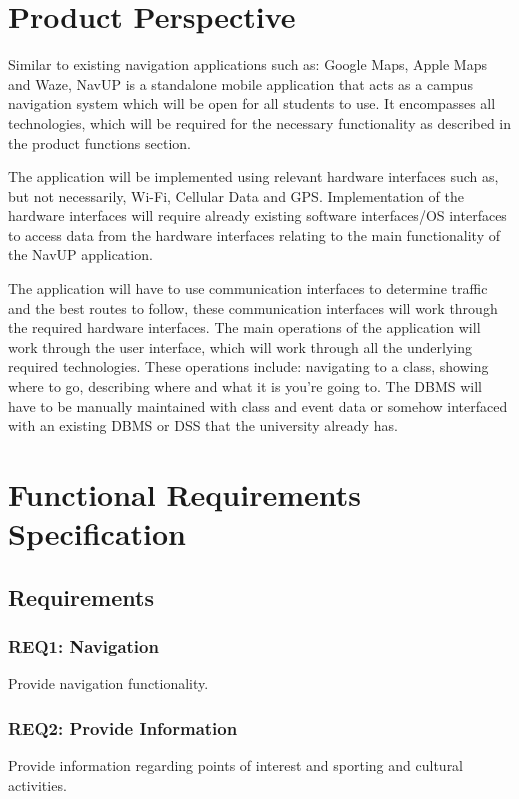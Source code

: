 \documentclass[11pt,a4paper]{report}
\begin{document}
	\section{Product Perspective}
	Similar to existing navigation applications such as: Google Maps, Apple Maps and Waze, NavUP is a standalone mobile application that acts as a campus navigation system which will be open for all students to use. It encompasses all technologies, which will be required for the necessary functionality as described in the product functions section. 
	\\
	\par
	The application will be implemented using relevant hardware interfaces such as, but not necessarily, Wi-Fi, Cellular Data and GPS. Implementation of the hardware interfaces will require already existing software interfaces/OS interfaces to access data from the hardware interfaces relating to the main functionality of the NavUP application. 
	\\
	\par
	The application will have to use communication interfaces to determine traffic and the best routes to follow, these communication interfaces will work through the required hardware interfaces. The main operations of the application will work through the user interface, which will work through all the underlying required technologies. These operations include: navigating to a class, 		showing where to go, describing where and what it is you're going to. The DBMS will have to be manually maintained with class and event data or somehow interfaced with an existing DBMS or DSS that the university already has. 

	\section{Functional Requirements Specification}
	\subsection{Requirements}
		
		\subsubsection{REQ1: Navigation}
			Provide navigation functionality.
			
		\subsubsection{REQ2: Provide Information}
			Provide information regarding points of interest and sporting and cultural activities.
			
\end{document}
